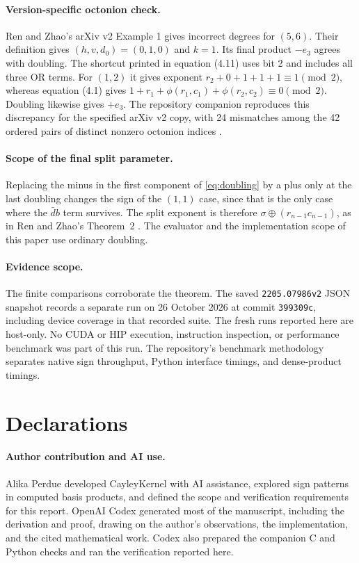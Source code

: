 \documentclass[11pt]{article}
\begin{document}
\paragraph{Version-specific octonion check.}
Ren and Zhao's arXiv v2 Example 1 gives incorrect degrees for
\((5,6)\). Their definition gives \((h,v,d_0)=(0,1,0)\)
and \(k=1\). Its final product \(-e_3\) agrees with doubling.
The shortcut printed in equation (4.11) uses bit 2 and includes
all three OR terms. For \((1,2)\) it gives exponent
\(r_2+0+1+1+1\equiv1\pmod 2\), whereas equation (4.1) gives
\(1+r_1+\phi(r_1,c_1)+\phi(r_2,c_2)\equiv0\pmod 2\).
Doubling likewise gives \(+e_3\). The repository companion
reproduces this discrepancy for the specified arXiv v2 copy, with
24 mismatches among the 42 ordered pairs of distinct nonzero octonion
indices \cite{renv2,cayley}.

\paragraph{Scope of the final split parameter.}
Replacing the minus in the first component of \eqref{eq:doubling}
by a plus only at the last doubling changes the sign of the
\((1,1)\) case, since that is the only case where the
\(\bar d b\) term survives. The split exponent is therefore
\(\sigma\oplus(r_{n-1}c_{n-1})\), as in Ren and Zhao's
Theorem~2 \cite{renv2}. The evaluator and the implementation
scope of this paper use ordinary doubling.

\paragraph{Evidence scope.}
The finite comparisons corroborate the theorem. The saved
\texttt{2205.07986v2} JSON snapshot records a separate run on
26 October 2026 at commit \texttt{399309c}, including device
coverage in that recorded suite. The fresh runs reported here are
host-only. No CUDA or HIP execution, instruction inspection, or
performance benchmark was part of this run. The repository's
benchmark methodology separates native sign throughput, Python
interface timings, and dense-product timings.

\section*{Declarations}
\paragraph{Author contribution and AI use.}
Alika Perdue developed CayleyKernel with AI assistance, explored sign
patterns in computed basis products, and defined the scope and verification
requirements for this report. OpenAI Codex generated most of the manuscript,
including the derivation and proof, drawing on the author's observations,
the implementation, and the cited mathematical work. Codex also prepared the
companion C and Python checks and ran the verification reported here.
\end{document}
